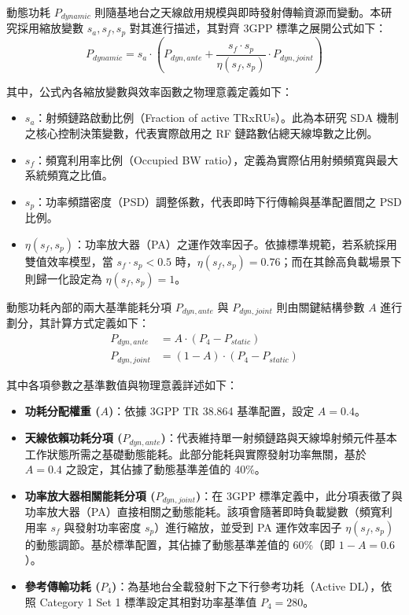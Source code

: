 動態功耗 $P_{dynamic}$ 則隨基地台之天線啟用規模與即時發射傳輸資源而變動。本研究採用縮放變數 $s_a, s_f, s_p$ 對其進行描述，其對齊 3GPP 標準之展開公式如下：
\begin{equation}
P_{dynamic} = s_a \cdot \left( P_{dyn, ante} + \frac{s_f \cdot s_p}{\eta(s_f, s_p)} \cdot P_{dyn, joint} \right)
\end{equation}

其中，公式內各縮放變數與效率函數之物理意義定義如下：
\begin{itemize}
    \item $s_a$：射頻鏈路啟動比例（Fraction of active TRxRUs）。此為本研究 SDA 機制之核心控制決策變數，代表實際啟用之 RF 鏈路數佔總天線埠數之比例。
    \item $s_f$：頻寬利用率比例（Occupied BW ratio），定義為實際佔用射頻頻寬與最大系統頻寬之比值。
    \item $s_p$：功率頻譜密度（PSD）調整係數，代表即時下行傳輸與基準配置間之 PSD 比例。
    \item $\eta(s_f, s_p)$：功率放大器（PA）之運作效率因子。依據標準規範，若系統採用雙值效率模型，當 $s_f \cdot s_p < 0.5$ 時，$\eta(s_f, s_p) = 0.76$；而在其餘高負載場景下則歸一化設定為 $\eta(s_f, s_p) = 1$。
\end{itemize}

動態功耗內部的兩大基準能耗分項 $P_{dyn, ante}$ 與 $P_{dyn, joint}$ 則由關鍵結構參數 $A$ 進行劃分，其計算方式定義如下：
\begin{align}
P_{dyn, ante} &= A \cdot (P_4 - P_{static}) \\
P_{dyn, joint} &= (1 - A) \cdot (P_4 - P_{static})
\end{align}

其中各項參數之基準數值與物理意義詳述如下：
\begin{itemize}
    \item \textbf{功耗分配權重 ($A$)}：依據 3GPP TR 38.864 基準配置，設定 $A = 0.4$。
    \item \textbf{天線依賴功耗分項 ($P_{dyn, ante}$)}：代表維持單一射頻鏈路與天線埠射頻元件基本工作狀態所需之基礎動態能耗。此部分能耗與實際發射功率無關，基於 $A=0.4$ 之設定，其佔據了動態基準差值的 40\%。
    \item \textbf{功率放大器相關能耗分項 ($P_{dyn, joint}$)}：在 3GPP 標準定義中，此分項表徵了與功率放大器（PA）直接相關之動態能耗。該項會隨著即時負載變數（頻寬利用率 $s_f$ 與發射功率密度 $s_p$）進行縮放，並受到 PA 運作效率因子 $\eta(s_f, s_p)$ 的動態調節。基於標準配置，其佔據了動態基準差值的 60\%（即 $1 - A = 0.6$）。
    \item \textbf{參考傳輸功耗 ($P_4$)}：為基地台全載發射下之下行參考功耗（Active DL），依照 Category 1 Set 1 標準設定其相對功率基準值 $P_4 = 280$。
\end{itemize}


